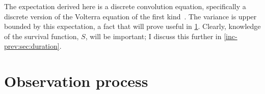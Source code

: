 \documentclass[thesis.tex]{subfiles}
\begin{document}

The expectation derived here is a discrete convolution equation, specifically a discrete version of the Volterra equation of the first kind~\autocite{brookmeyerBackcalculation}.
The variance is upper bounded by this expectation, a fact that will prove useful in \cref{inc-prev:sec:observation-process}.
Clearly, knowledge of the survival function, $S$, will be important; I discuss this further in \cref{inc-prev:sec:duration}.

\section{Observation process} \label{inc-prev:sec:observation-process}

\end{document}
